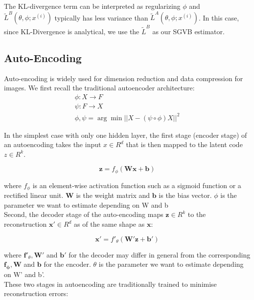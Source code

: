 \documentclass[11pt]{article}
\begin{document}
The KL-divergence term can be interpreted as regularizing $\phi$ and $\widetilde{L}^B(\theta, \phi; x^{(i)})$ typically has less variance than $\widetilde{L}^A(\theta, \phi; x^{(i)})$. In this case, since KL-Divergence is analytical, we use the $\widetilde{L}^B$ as our SGVB estimator. 

\subsection{Auto-Encoding}
Auto-encoding is widely used for dimension reduction and data compression for images. We first recall the traditional autoencoder architecture:
\begin{eqnarray}
\phi: X\to F \\
\psi: F\to X \\
\phi, \psi = \arg\min||X-(\psi\circ\phi) X||^2
\end{eqnarray}

In the simplest case with only one hidden layer, the first stage (encoder stage) of an autoencoding takes the input $x \in R^d$ that is then mapped to the latent code $z \in R^k$.

\begin{equation}
\mathbf{z}=f_{\phi}(\mathbf{Wx}+\mathbf{b})
\end{equation}

where $f_{\phi}$ is an element-wise activation function such as a sigmoid function or a rectified linear unit. $\mathbf {W}$ is the weight matrix and $\mathbf {b}$ is the bias vector. $\phi$ is the parameter we want to estimate depending on W and b\\ 

Second, the decoder stage of the auto-encoding maps $\mathbf {z} \in R^k$ to the reconstruction $\mathbf {x'} \in R^d $ as of the same shape as $\mathbf{x}$:

\begin{equation}
\mathbf{x'}=f'_{\theta}(\mathbf{W'z}+\mathbf{b'})
\end{equation}

where $\mathbf f'_{\theta} ,\mathbf {W'}$ and $\mathbf {b'}$ for the decoder may differ in general from the corresponding $\mathbf {f_{\phi}} ,\mathbf {W}$ and $\mathbf {b}$ for the encoder. $\theta$ is the parameter we want to estimate depending on W' and b'.\\ 

These two stages in autoencoding are traditionally trained to minimise reconstruction errors:
\end{document}
